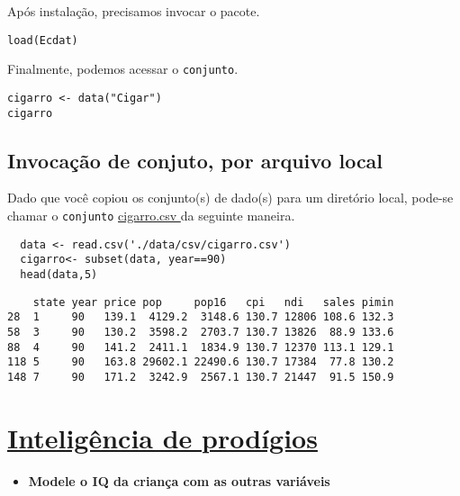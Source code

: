 \documentclass[12pt]{abntex2}
\begin{document}
Após instalação, precisamos invocar o pacote.
\begin{verbatim}
load(Ecdat)
\end{verbatim}

Finalmente, podemos acessar o \texttt{conjunto}.
\begin{verbatim}
cigarro <- data("Cigar")
cigarro
\end{verbatim}

\subsection{Invocação de conjuto, por arquivo local}
\label{sec:org458a125}

Dado que você copiou os conjunto(s) de dado(s) para um diretório
local, pode-se chamar o \texttt{conjunto} \href{https://drive.google.com/file/d/1iOQFp0TshV8km2X13fRkXGm8kd-ZVfSL/view?usp=sharing}{cigarro.csv }da seguinte maneira.

\begin{verbatim}
  data <- read.csv('./data/csv/cigarro.csv')
  cigarro<- subset(data, year==90)
  head(data,5)
\end{verbatim}

\begin{verbatim}
    state year price pop     pop16   cpi   ndi   sales pimin
28  1     90   139.1  4129.2  3148.6 130.7 12806 108.6 132.3
58  3     90   130.2  3598.2  2703.7 130.7 13826  88.9 133.6
88  4     90   141.2  2411.1  1834.9 130.7 12370 113.1 129.1
118 5     90   163.8 29602.1 22490.6 130.7 17384  77.8 130.2
148 7     90   171.2  3242.9  2567.1 130.7 21447  91.5 150.9
\end{verbatim}

\section{\href{https://www.openintro.org/data/index.php?data=gifted}{Inteligência de prodígios}}
\label{sec:org99eddfe}
\begin{itemize}
\item \textbf{Modele o IQ da criança com as outras variáveis}
\end{itemize}
\end{document}
